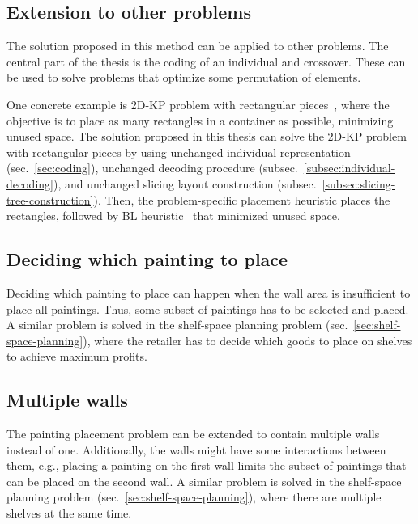 \subsection{Extension to other problems}\label{subsec:extension-to-other-problems}

The solution proposed in this method can be applied to other problems.
The central part of the thesis is the coding of an individual and crossover.
These can be used to solve problems that optimize some permutation of elements.

One concrete example is 2D-KP problem with rectangular pieces~\cite{bortfeldtGeneticAlgorithmTwodimensional2009},
where the objective is to place as many rectangles in a container as possible,
minimizing unused space.
The solution proposed in this thesis can solve the 2D-KP problem with rectangular pieces by
using unchanged individual representation (sec.~\ref{sec:coding}), unchanged decoding procedure (subsec.~\ref{subsec:individual-decoding}),
and unchanged slicing layout construction (subsec.~\ref{subsec:slicing-tree-construction}).
Then, the problem-specific placement heuristic places the rectangles,
followed by BL heuristic~\cite{chazelleBottomnLeftBinPackingHeuristic1983} that minimized unused space.

\subsection{Deciding which painting to place}\label{subsec:deciding-which-painting-to-place}
Deciding which painting to place can happen when the wall area is insufficient to place all paintings.
Thus, some subset of paintings has to be selected and placed.
A similar problem is solved in the shelf-space planning problem (sec.~\ref{sec:shelf-space-planning}),
where the retailer has to decide which goods to place on shelves to achieve maximum profits.

\subsection{Multiple walls}\label{subsec:multiple-walls-for-painting-placement}

The painting placement problem can be extended to contain multiple walls instead of one.
Additionally, the walls might have some interactions between them, e.g., placing a painting on the first wall
limits the subset of paintings that can be placed on the second wall.
A similar problem is solved in the shelf-space planning problem (sec.~\ref{sec:shelf-space-planning}),
where there are multiple shelves at the same time.

